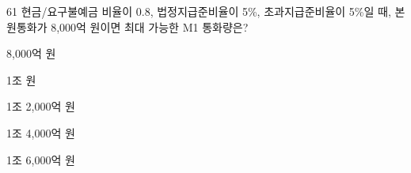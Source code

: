 \begin{question}{61}
현금/요구불예금 비율이 0.8, 법정지급준비율이 5\%, 초과지급준비율이 5\%일 때, 본원통화가 8,000억 원이면 최대 가능한 M1 통화량은?
\begin{choices}
  \item 8,000억 원
  \item 1조 원
  \item 1조 2,000억 원
  \item 1조 4,000억 원
  \item 1조 6,000억 원
\end{choices}
\end{question}
